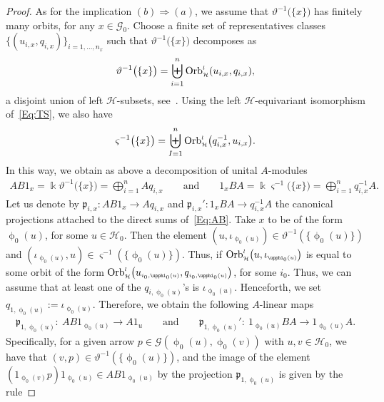 \documentclass[10pt,a4paper]{amsart}
\numberwithin{equation}{section}
\newcommand{\fk}[1]{\mathfrak{#1}}
\newcommand{\Go}{\cG_{\Sscript{0}}}
\newcommand{\Ho}{\cH_{\Sscript{0}}}
\newcommand{\Orbit}[2]{{{\rm Orb}}_{\Sscript{\mathcal{#2}}}^{\Sscript{l}}\big(
#1 \big)}
\newcommand{\cG}{{\mathcal G}}
\newcommand{\cH}{{\mathcal H}}
\newcommand{\Sscript}[1]{\scriptscriptstyle{#1}}
\newcommand{\phio}{\upphi_{\Sscript{0}}}
\begin{document}
\begin{proof}
As for the implication $(b) \Rightarrow (a)$, we assume that $\vartheta^{-1}\big( \{x\}\big)$ has finitely many orbits, for any $x \in \Go$. Choose a finite set of representatives classes
$\{(u_{\Sscript{i, x}}, q_{\Sscript{i, x}})\}_{\Sscript{i=1,\dots, n_{x}}}$ such that $\vartheta^{-1}\big( \{x\}\big)$ decomposes as
\begin{gather*}
\vartheta^{-1}\big( \{x\}\big)= \biguplus_{i=1}^{n}{\rm Orb}_{\Sscript{\cH}}^{\Sscript{l}}(u_{i, x},q_{i, x}),
\end{gather*}
a disjoint union of left $\cH$-subsets, see~\cite{Kaoutit/Spinosa:2018}. Using the left $\cH$-equivariant isomorphism of~\eqref{Eq:TS}, we also have
\begin{gather*}
\varsigma^{-1}\big( \{x\}\big) = \biguplus_{I=1}^{n} {\rm Orb}_{\Sscript{\cH}}^{\Sscript{l}}\big(q_{i, x}^{-1}, u_{i, x}\big).
\end{gather*}
In this way, we obtain as above a decomposition of unital $A$-modules
\begin{gather}\label{Eq:AB}
AB1_{\Sscript{x}}=\Bbbk \vartheta^{-1}\big( \{x\}\big) = \bigoplus_{i=1}^{n} A q_{i, x}\qquad \text{and}\qquad 1_{\Sscript{x}}BA= \Bbbk \varsigma^{-1}\big( \{x\}\big) =\bigoplus_{i=1}^{n} q_{i, x}^{-1} A.
\end{gather}
Let us denote by $\fk{p}_{\Sscript{i, x}}\colon AB1_{\Sscript{x}} \to Aq_{\Sscript{i, x}}$ and $\fk{p}_{\Sscript{i, x}}'\colon 1_{\Sscript{x}}BA \to q_{\Sscript{i, x}}^{-1}A$ the canonical projections attached to the direct sums of~\eqref{Eq:AB}. Take $x$ to be of the form $\phio(u)$, for some $u \in \Ho$. Then the element $(u, \iota_{\Sscript{\phio(u)}}) \in \vartheta^{-1}(\{\phio(u)\})$ and $(\iota_{\Sscript{\phio(u)}}, u) \in \varsigma^{-1}(\{\phio(u)\})$. Thus, if $\Orbit{u, \iota_{\Sscript{\phio(u)}}}{H}$ is equal to some orbit of the form $\Orbit{u_{\Sscript{i_0, \phio(u)}}, q_{\Sscript{i_0, \phio(u)}}}{H}$, for some $i_0$. Thus, we can assume that at least one of the $q_{\Sscript{i, \phio(u)}}$'s is $\iota_{\Sscript{\phio(u)}}$. Henceforth, we set $q_{\Sscript{1, \phio(u)}} :=\iota_{\Sscript{\phio(u)}}$. Therefore, we obtain the following $A$-linear maps
\begin{gather*}
\fk{p}_{\Sscript{1, \phio(u)}}\colon \ AB1_{\Sscript{\phio(u)}} \to A 1_{\Sscript{u}}\qquad \text{and} \qquad \fk{p}_{\Sscript{1, \phio(u)}}'\colon \ 1_{\Sscript{\phio(u)}}BA \to 1_{\Sscript{\phio(u)}}A.
\end{gather*}
Specifically, for a given arrow $p \in\cG(\phio(u), \phio(v))$ with $u,v \in \Ho$, we have that $(v,p) \in \vartheta^{-1}(\{\phio(u)\})$, and the image of the element $ (1_{\Sscript{\phio(v)}} p) 1_{\Sscript{\phio(u)}} \in AB 1_{\Sscript{\phio(u)}}$ by the projection $\fk{p}_{\Sscript{1, \phio(u)}}$ is given by the rule

\end{proof}
\end{document}

